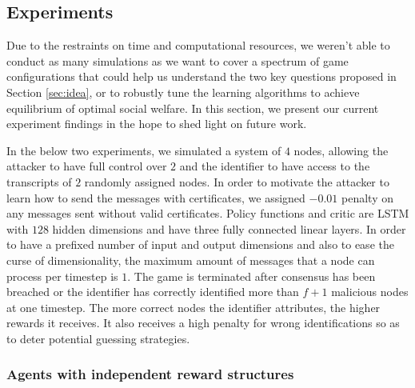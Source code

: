 \documentclass[a4paper,11pt]{article}
\begin{document}
\subsection{Experiments}\label{sec:experiments}
Due to the restraints on time and computational resources, we weren't able to conduct as many simulations as we want to cover a spectrum of game configurations that could help us understand the two key questions proposed in Section \ref{sec:idea}, or to robustly tune the learning algorithms to achieve equilibrium of optimal social welfare. In this section, we present our current experiment findings in the hope to shed light on future work. 

In the below two experiments, we simulated a system of $4$ nodes, allowing the attacker to have full control over $2$ and the identifier to have access to the transcripts of $2$ randomly assigned nodes. In order to motivate the attacker to learn how to send the messages with certificates, we assigned $-0.01$ penalty on any messages sent without valid certificates. Policy functions and critic are LSTM with $128$ hidden dimensions and have three fully connected linear layers. In order to have a prefixed number of input and output dimensions and also to ease the curse of dimensionality, the maximum amount of messages that a node can process per timestep is $1$. The game is terminated after consensus has been breached or the identifier has correctly identified more than $f+1$ malicious nodes at one timestep. The more correct nodes the identifier attributes, the higher rewards it receives. It also receives a high penalty for wrong identifications so as to deter potential guessing strategies.

\subsubsection{Agents with independent reward structures}
\end{document}
